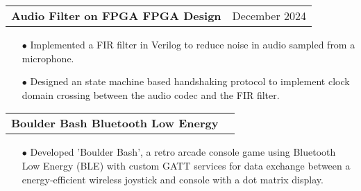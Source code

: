 \documentclass[11pt]{article}
\makeatletter
\newcommand{\resumeSubheadingP}[2]{
  \vspace{-2pt}\item
    \begin{tabular*}{1.0\textwidth}[t]{l@{\extracolsep{\fill}}r}
       \textbf{{\large #1}}&{#2} \\
    \end{tabular*}\vspace{-1pt}
}
\makeatother
\begin{document}
\resumeSubheadingP
{Audio Filter on FPGA \textbar{ } FPGA Design}{December 2024}
\begin{itemize}[leftmargin=0.3in]\setlength{\itemsep}{0pt}\setlength{\parskip}{0pt}\vspace{-0.2cm}
  \item[$\bullet$] Implemented a FIR filter in Verilog to reduce noise in audio sampled from a microphone.
  \item[$\bullet$] Designed an state machine based handshaking protocol to implement clock domain crossing between the audio codec and the FIR filter.
\end{itemize}
\vspace{-0.3cm}



\resumeSubheadingP
{Boulder Bash \textbar{ } Bluetooth Low Energy}{}
\begin{itemize}[leftmargin=0.3in]\setlength{\itemsep}{0pt}\setlength{\parskip}{0pt}\vspace{-0.2cm}
  \item[$\bullet$] Developed 'Boulder Bash', a retro arcade console game using Bluetooth Low Energy (BLE) with custom GATT services for data exchange between a energy-efficient wireless joystick and console with a dot matrix display. 
\end{itemize}
\vspace{-0.2cm}
\end{document}
